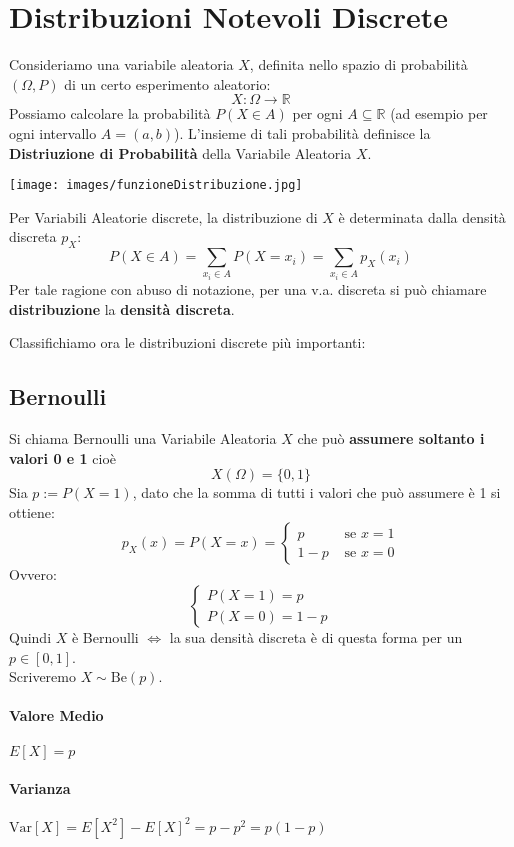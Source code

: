 \section{Distribuzioni Notevoli Discrete}
Consideriamo una variabile aleatoria $X$, definita nello spazio di probabilità
$(\Omega, P)$ di un certo esperimento aleatorio:
\[
    X:\Omega \rightarrow \mathbb{R} 
\]
Possiamo calcolare la probabilità $P(X \in A)$ per ogni $A \subseteq \mathbb{R}$
(ad esempio per ogni intervallo $A=(a,b)$).
L'insieme di tali probabilità definisce la \textbf{Distriuzione di Probabilità} della Variabile Aleatoria $X$.
\begin{center}
    \texttt{[image: images/funzioneDistribuzione.jpg]}
\end{center}

Per Variabili Aleatorie discrete, la distribuzione di $X$ è determinata dalla densità discreta $p_X$:
\[
    P(X \in A) = \sum_{x_i \in A} P(X=x_i) = \sum_{x_i \in A} p_X(x_i)  
\]
Per tale ragione con abuso di notazione, per una v.a. discreta si può chiamare
\textbf{distribuzione} la \textbf{densità discreta}.

Classifichiamo ora le distribuzioni discrete più importanti:

\subsection{Bernoulli}
Si chiama Bernoulli una Variabile Aleatoria $X$ che può \textbf{assumere soltanto i valori 0 e 1} cioè
\[
    X(\Omega) = \{0,1\}
\]
Sia $p:=P(X=1)$, dato che la somma di tutti i valori che può assumere è 1 si ottiene:
\[
    p_X (x) = P(X=x) = 
    \begin{cases}
    p  & \text{ se } x=1\\
    1-p  & \text{ se } x=0
    \end{cases} 
\]
Ovvero:
\[
    \begin{cases}
        P(X=1) = p\\
        P(X=0)= 1-p
    \end{cases}
\]
Quindi $X$ è Bernoulli $\Leftrightarrow$ la sua densità discreta è di questa
forma per un $p \in [0,1]$.
\\ Scriveremo $X \sim \text{Be}(p)$.
\paragraph*{Valore Medio} $E[X] = p$
\paragraph*{Varianza} $\text{Var}[X] = E[X^2] - E[X]^2 = p-p^2 = p(1-p)$

